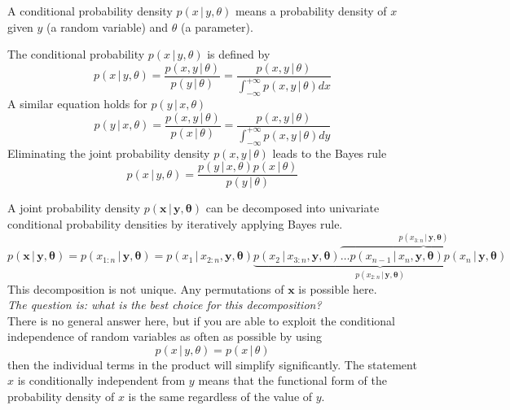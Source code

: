 \documentclass{tstextbook}
\begin{document}
A conditional probability density $p(x\,\vert\, y,\theta)$ means a probability density of $x$ given $y$ (a random variable) and $\theta$ (a parameter).

\begin{definition}
  \label{th:conditionalprobabilitydensity}
  The conditional probability $p(x\,\vert\, y,\theta)$ is defined by
  \begin{equation}
    p(x\,\vert\, y,\theta)=\frac{p(x, y\,\vert\, \theta)}{p(y\,\vert\, \theta)}=\frac{p(x, y\,\vert\, \theta)}{\int_{-\infty}^{+\infty}p(x,y\,\vert\, \theta)dx}
  \end{equation}
  A similar equation holds for $p(y\,\vert\, x,\theta)$
  \begin{equation}
    p(y\,\vert\, x,\theta)=\frac{p(x, y\,\vert\, \theta)}{p(x\,\vert\, \theta)}=\frac{p(x, y\,\vert\, \theta)}{\int_{-\infty}^{+\infty}p(x,y\,\vert\, \theta)dy}
  \end{equation}
  Eliminating the joint probability density $p(x, y\,\vert\, \theta)$ leads to the Bayes rule
  \begin{equation}
    p(x\,\vert\, y,\theta)=\frac{p(y\,\vert\, x,\theta)p(x\,\vert\, \theta)}{p(y\,\vert\, \theta)}
  \end{equation} 
\end{definition}

A joint probability density $p(\mathbf{x}\,\vert\, \mathbf{y},\boldsymbol{\theta})$ can be decomposed into univariate conditional probability densities by iteratively applying Bayes rule.
  \begin{equation}
  \label{eq:decomposition}
    p(\mathbf{x}\,\vert\, \mathbf{y},\boldsymbol{\theta})=p(x_{1:n}\,\vert\, \mathbf{y},\boldsymbol{\theta})=p(x_1\,\vert\, x_{2:n},\mathbf{y},\boldsymbol{\theta})
\underbrace{p(x_{2}\,\vert\, x_{3:n},\mathbf{y},\boldsymbol{\theta})\overbrace{\ldots p(x_{n-1}\,\vert\, x_n,\mathbf{y},\boldsymbol{\theta})
p(x_{n}\,\vert\, \mathbf{y},\boldsymbol{\theta})}^{p(x_{3:n}\,\vert\, \mathbf{y},\boldsymbol{\theta})}
}_{p(x_{2:n}\,\vert\, \mathbf{y},\boldsymbol{\theta})}
  \end{equation}
This decomposition is not unique. Any permutations of $\mathbf{x}$ is possible here.\\

\textit{The question is: what is the best choice for this decomposition?}\\

There is no general answer here, but if you are able to exploit the conditional independence of random variables as often as possible by using
  \begin{equation}
    p(x\,\vert\, y,\theta)=p(x\,\vert\, \theta)
  \end{equation}
then the individual terms in the product will simplify significantly.
The statement $x$ is conditionally independent from $y$ means that the functional form of the probability density of $x$ is the same regardless of the value of $y$.\\
\end{document}
